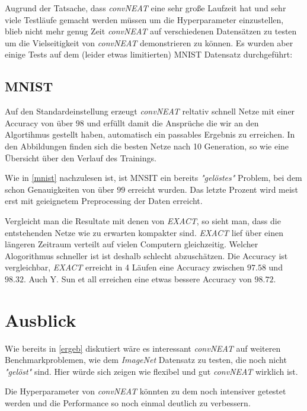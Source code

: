 \documentclass[]{scrartcl}
\begin{document}
		Augrund der Tatsache, dass \textit{convNEAT} eine sehr große Laufzeit hat und sehr viele Testläufe gemacht werden müssen um die Hyperparameter einzustellen, blieb nicht mehr genug Zeit
		\textit{convNEAT} auf verschiedenen Datensätzen zu testen um die Vielseitigkeit von \textit{convNEAT} demonstrieren zu können.
		Es wurden aber einige Tests auf dem (leider etwas limitierten) MNIST Datensatz durchgeführt:

		\subsection{MNIST}
			
			Auf den Standardeinstellung erzeugt \textit{convNEAT} reltativ schnell Netze mit einer Accuracy von über $98$ und erfüllt damit die Ansprüche die wir an
			den Algortihmus gestellt haben, automatisch ein passables Ergebnis zu erreichen.
			In den Abbildungen finden sich die besten Netze nach 10 Generation, so wie eine Übersicht über den Verlauf des Trainings.


			Wie in \ref{mnist} nachzulesen ist, ist MNSIT ein bereits \textit{"gelöstes"} Problem, bei dem schon Genauigkeiten von über $99$ erreicht wurden.
			Das letzte Prozent wird meist erst mit geieignetem Preprocessing der Daten erreicht.

			Vergleicht man die Resultate mit denen von \textit{EXACT}, so sieht man, dass die entstehenden Netze wie zu erwarten kompakter sind.
			\textit{EXACT} lief über einen längeren Zeitraum verteilt auf vielen Computern gleichzeitig.
			Welcher Alogorithmus schneller ist ist deshalb schlecht abzuschätzen.
			Die Accuracy ist vergleichbar, \textit{EXACT} erreicht in 4 Läufen eine Accuracy zwischen $97.58$ und $98.32$.
			Auch Y. Sun et all erreichen eine etwas bessere Accuracy von $98.72$.

		
	\section{Ausblick}

		Wie bereits in \ref{ergeb} diskutiert wäre es interessant \textit{convNEAT} auf weiteren Benchmarkproblemen, wie dem \textit{ImageNet} Datensatz zu testen,
		die noch nicht \textit{"gelöst"} sind. Hier würde sich zeigen wie flexibel und gut \textit{convNEAT} wirklich ist.

		Die Hyperparameter von \textit{convNEAT} könnten zu dem noch intensiver getestet werden und die Performance so noch einmal deutlich zu verbessern.
\end{document}
